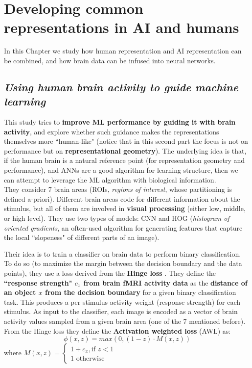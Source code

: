 \chapter{Developing common representations in AI and humans}
\label{chap:common_representations}

In this Chapter we study how human representation and AI representation can be combined, and how brain data can be infused into neural networks.

\section[Using human brain activity to guide machine learning]{\textit{Using human brain activity to guide machine learning}\\ }

This study tries to \textbf{improve ML performance by guiding it with brain activity}, and explore whether such guidance makes the representations themselves more ``human-like" (notice that in this second part the focus is not on performance but on \textbf{representational geometry}). The underlying idea is that, if the human brain is a natural reference point (for representation geometry and performance), and ANNs are a good algorithm for learning structure, then we can attempt to leverage the ML algorithm with biological information.\\

They consider 7 brain areas (ROIs, \textit{regions of interest}, whose partitioning is defined a-priori). Different brain areas code for different information about the stimulus, but all of them are involved in \textbf{visual processing} (either low, middle, or high level). They use two types of models: CNN and HOG (\textit{histogram of oriented gradients}, an often-used algorithm for generating features that capture the local ``slopeness" of different parts of an image).

Their idea is to train a classifier on brain data to perform binary classification. To do so (to maximize the margin between the decision boundary and the data points), they use a loss derived from the \textbf{Hinge loss} \notet. They define the \textbf{``response strength" $c_x$ from brain fMRI activity data} as the \textbf{distance of an object $x$ from the decision boundary} for a given binary classification task.
This produces a per-stimulus activity weight (response strength) for each stimulus. As input to the classifier, each image is encoded as a vector of brain activity values sampled from a given brain area (one of the 7 mentioned before).
From the Hinge loss they define the \textbf{Activation weighted loss} (AWL) as:
\[
\phi (x, z) = max(0, (1-z) \cdot M(x,z))
\]
where $M(x,z) =\begin{cases}
         1+c_x, \text{if } z<1\\
        1 \text{ otherwise}
        \end{cases}$

